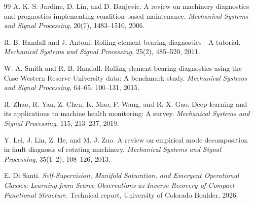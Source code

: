 \documentclass[11pt,letterpaper]{article}
\begin{document}
\begin{thebibliography}{99}
A. K. S. Jardine, D. Lin, and D. Banjevic.
\newblock A review on machinery diagnostics and prognostics implementing condition-based maintenance.
\newblock \emph{Mechanical Systems and Signal Processing}, 20(7), 1483--1510, 2006.

R. B. Randall and J. Antoni.
\newblock Rolling element bearing diagnostics---A tutorial.
\newblock \emph{Mechanical Systems and Signal Processing}, 25(2), 485--520, 2011.

W. A. Smith and R. B. Randall. 
\newblock Rolling element bearing diagnostics using the Case Western Reserve University data: A benchmark study.
\newblock \emph{Mechanical Systems and Signal Processing}, 64--65, 100--131, 2015.

R. Zhao, R. Yan, Z. Chen, K. Mao, P. Wang, and R. X. Gao.
\newblock Deep learning and its applications to machine health monitoring: A survey.
\newblock \emph{Mechanical Systems and Signal Processing}, 115, 213--237, 2019.

Y. Lei, J. Lin, Z. He, and M. J. Zuo.
\newblock A review on empirical mode decomposition in fault diagnosis of rotating machinery.
\newblock \emph{Mechanical Systems and Signal Processing}, 35(1--2), 108--126, 2013.

E. Di Santi.
\newblock \emph{Self-Supervision, Manifold Saturation, and Emergent Operational Classes: Learning from Scarce Observations as Inverse Recovery of Compact Functional Structure}.
\newblock Technical report, University of Colorado Boulder, 2026.

\end{thebibliography}
\end{document}
